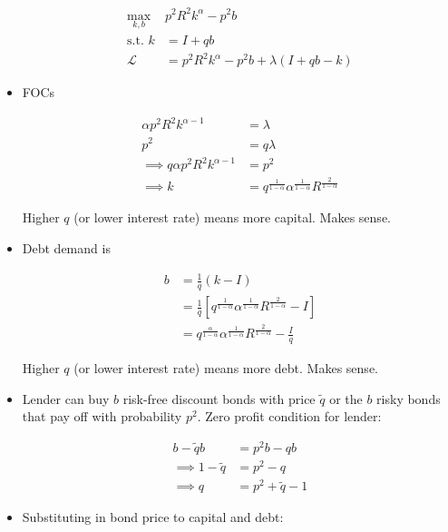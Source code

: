 \documentclass{article}
\newcommand{\Lfn}{\mathcal{L}}
\begin{document}
\begin{itemize}
\begin{align*}
\max_{k,b} & p^2 R^2 k^\alpha  - p^2 b\\
\text{s.t. } k &= I + qb\\
\Lfn &= p^2 R^2 k^\alpha  - p^2 b + \lambda(I + qb - k)
\end{align*}

\item FOCs

\begin{align*}
\alpha p^2 R^2 k^{\alpha-1} &= \lambda\\
p^2 &= q\lambda\\
\implies
q\alpha p^2 R^2 k^{\alpha-1} &= p^2\\
\implies
k &= q^{\frac{1}{1-\alpha}}\alpha^{\frac{1}{1-\alpha}}  R^{\frac{2}{1-\alpha}} 
\end{align*}

Higher $q$ (or lower interest rate) means more capital. Makes sense.

\item Debt demand is

\begin{align*}
b 
&= \frac{1}{q}(k  - I) \\
&= \frac{1}{q}[q^{\frac{1}{1-\alpha}}\alpha^{\frac{1}{1-\alpha}}  R^{\frac{2}{1-\alpha}}   - I]\\
&= q^{\frac{\alpha}{1-\alpha}}\alpha^{\frac{1}{1-\alpha}}  R^{\frac{2}{1-\alpha}}   - \frac{I}{q}
\end{align*}

Higher $q$ (or lower interest rate) means more debt. Makes sense.

\item Lender can buy $b$ risk-free discount bonds with price $\tilde q$ or the $b$ risky bonds that pay off with probability $p^2$. Zero profit condition for lender:

\begin{align*}
b - \tilde q b &= p^2 b - q b \\
\implies
1 - \tilde q &= p^2 - q \\
\implies
q &= p^2 + \tilde q  - 1
\end{align*}

\item Substituting in bond price to capital and debt:


\end{itemize}
\end{document}
